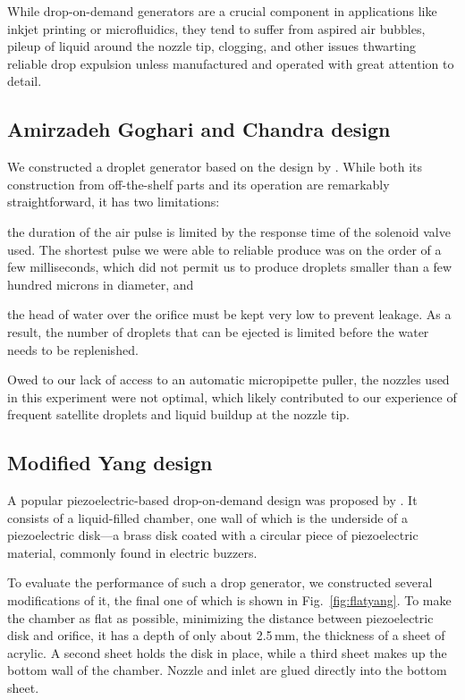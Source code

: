 \documentclass[11.5pt,oneside]{book}
\newcommand*{\figref}[1]{Fig.~\ref{#1}}
\begin{document}
While drop-on-demand generators are a crucial component in applications like inkjet
printing or microfluidics, they tend to suffer from aspired air bubbles, pileup
of liquid around the nozzle tip, clogging, and other issues thwarting reliable
drop expulsion unless manufactured and operated with great attention to detail.

\subsection{Amirzadeh Goghari and Chandra design}
We constructed a droplet generator based on the design by \citet{Goghari08}.
While both its construction from off-the-shelf parts and its operation are
remarkably straightforward, it has two limitations:

\begin{alist}
    \item the duration of the air pulse is limited by the response time of the
        solenoid valve used. The shortest pulse we were able to reliable produce
        was on the order of a few milliseconds, which did not permit us to
        produce droplets smaller than a few hundred microns in diameter, and
    \item the head of water over the orifice must be kept very low to prevent 
        leakage. As a result, the number of droplets that can be ejected is
        limited before the water needs to be replenished.
\end{alist}

Owed to our lack of access to an automatic micropipette puller, the nozzles used
in this experiment were not optimal, which likely contributed to our experience
of frequent satellite droplets and liquid buildup at the nozzle tip.

\subsection{Modified Yang design}
A popular piezoelectric-based drop-on-demand design was proposed by
\citet{Yang97}. It consists of a liquid-filled chamber, one wall of which is the
underside of a piezoelectric disk---a brass disk coated with a circular piece of
piezoelectric material, commonly found in electric buzzers.

To evaluate the performance of such a drop generator, we constructed several
modifications of it, the final one of which is shown in \figref{fig:flatyang}.
To make the chamber as flat as possible, minimizing the distance between
piezoelectric disk and orifice, it has a depth of only about 2.5$\,$mm, the
thickness of a sheet of acrylic. A second sheet holds the disk in place, while a
third sheet makes up the bottom wall of the chamber. Nozzle and inlet are glued
directly into the bottom sheet.
\end{document}
